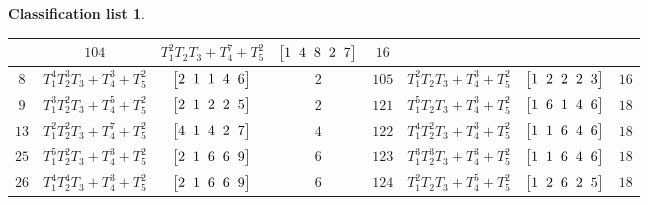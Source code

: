 \documentclass[pdftex]{sigma}%
\theoremstyle{definition}
\newtheorem{class-list}[thm]{Classification list}
\numberwithin{equation}{section}
\begin{document}
\begin{class-list}
\begin{table}[h!]
\begin{tabu}{c|c|c|c||c|c|c|c}
&${104}$&${T_{1}^{2}T_{2}T_{3}+T_{4}^{7}+T_{5}^{2}}$
&$\arraycolsep=1mm\begin{bmatrix}{1} & {4} & {8} & {2} & {7}\end{bmatrix}$&${16}$
\\ \hline
${8}$&${T_{1}^{4}T_{2}^{3}T_{3}+T_{4}^{3}+T_{5}^{2}}$
&$\arraycolsep=1mm\begin{bmatrix}{2} & {1} & {1} & {4} & {6}\end{bmatrix}$&${2}$
&${105}$&${T_{1}^{2}T_{2}T_{3}+T_{4}^{3}+T_{5}^{2}}$
&$\arraycolsep=1mm\begin{bmatrix}{1} & {2} & {2} & {2} & {3}\end{bmatrix}$&${16}$
\\ \hline
${9}$&${T_{1}^{3}T_{2}^{2}T_{3}+T_{4}^{5}+T_{5}^{2}}$
&$\arraycolsep=1mm\begin{bmatrix}{2} & {1} & {2} & {2} & {5}\end{bmatrix}$&${2}$
&${121}$&${T_{1}^{5}T_{2}T_{3}+T_{4}^{3}+T_{5}^{2}}$
&$\arraycolsep=1mm\begin{bmatrix}{1} & {6} & {1} & {4} & {6}\end{bmatrix}$&${18}$
\\ \hline
${13}$&${T_{1}^{2}T_{2}^{2}T_{3}+T_{4}^{7}+T_{5}^{2}}$
&$\arraycolsep=1mm\begin{bmatrix}{4} & {1} & {4} & {2} & {7}\end{bmatrix}$&${4}$
&${122}$&${T_{1}^{4}T_{2}^{2}T_{3}+T_{4}^{3}+T_{5}^{2}}$
&$\arraycolsep=1mm\begin{bmatrix}{1} & {1} & {6} & {4} & {6}\end{bmatrix}$&${18}$
\\ \hline
${25}$&${T_{1}^{5}T_{2}^{2}T_{3}+T_{4}^{3}+T_{5}^{2}}$
&$\arraycolsep=1mm\begin{bmatrix}{2} & {1} & {6} & {6} & {9}\end{bmatrix}$&${6}$
&${123}$&${T_{1}^{3}T_{2}^{3}T_{3}+T_{4}^{3}+T_{5}^{2}}$
&$\arraycolsep=1mm\begin{bmatrix}{1} & {1} & {6} & {4} & {6}\end{bmatrix}$&${18}$
\\ \hline
${26}$&${T_{1}^{4}T_{2}^{4}T_{3}+T_{4}^{3}+T_{5}^{2}}$
&$\arraycolsep=1mm\begin{bmatrix}{2} & {1} & {6} & {6} & {9}\end{bmatrix}$&${6}$
&${124}$&${T_{1}^{2}T_{2}T_{3}+T_{4}^{5}+T_{5}^{2}}$
&$\arraycolsep=1mm\begin{bmatrix}{1} & {2} & {6} & {2} & {5}\end{bmatrix}$&${18}$

\end{tabu}
\end{table}
\end{class-list}
\end{document}
